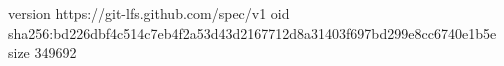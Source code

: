 version https://git-lfs.github.com/spec/v1
oid sha256:bd226dbf4c514c7eb4f2a53d43d2167712d8a31403f697bd299e8cc6740e1b5e
size 349692
